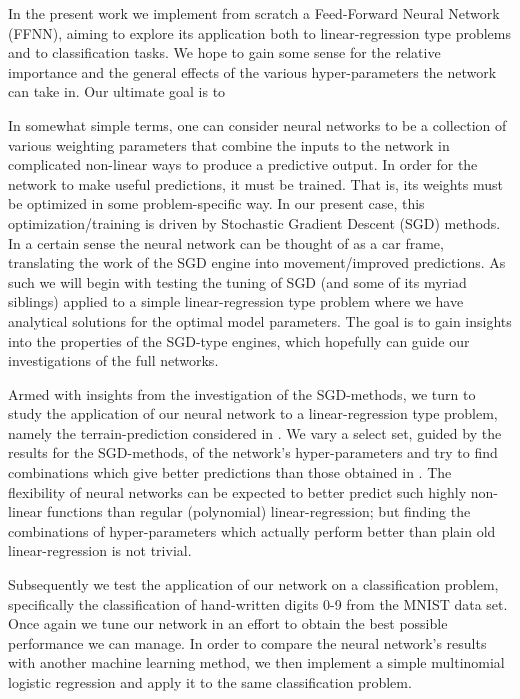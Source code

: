 \documentclass[reprint, english, nofootinbib]{revtex4-2}
\begin{document}
In the present work we implement from scratch a Feed-Forward Neural Network (FFNN), aiming to explore its application both to linear-regression type problems and to classification tasks. We hope to gain some sense for the relative importance and the general effects of the various hyper-parameters the network can take in. Our ultimate goal is to 

In somewhat simple terms, one can consider neural networks to be a collection of various weighting parameters that combine the inputs to the network in complicated non-linear ways to produce a predictive output. In order for the network to make useful predictions, it must be trained. That is, its weights must be optimized in some problem-specific way. In our present case, this optimization/training is driven by Stochastic Gradient Descent (SGD) methods. In a certain sense the neural network can be thought of as a car frame, translating the work of the SGD engine into movement/improved predictions. As such we will begin with testing the tuning of SGD (and some of its myriad siblings) applied to a simple linear-regression type problem where we have analytical solutions for the optimal model parameters. The goal is to gain insights into the properties of the SGD-type engines, which hopefully can guide our investigations of the full networks.

Armed with insights from the investigation of the SGD-methods, we turn to study the application of our neural network to a linear-regression type problem, namely the terrain-prediction considered in \cite{4155_project_1}. We vary a select set, guided by the results for the SGD-methods, of the network's hyper-parameters and try to find combinations which give better predictions than those obtained in \cite{4155_project_1}. The flexibility of neural networks can be expected to better predict such highly non-linear functions than regular (polynomial) linear-regression; but finding the combinations of hyper-parameters which actually perform better than plain old linear-regression is not trivial. 

Subsequently we test the application of our network on a classification problem, specifically the classification of hand-written digits 0-9 from the MNIST data set. Once again we tune our network in an effort to obtain the best possible performance we can manage. In order to compare the neural network's results with another machine learning method, we then implement a simple multinomial logistic regression and apply it to the same classification problem. 
\end{document}
